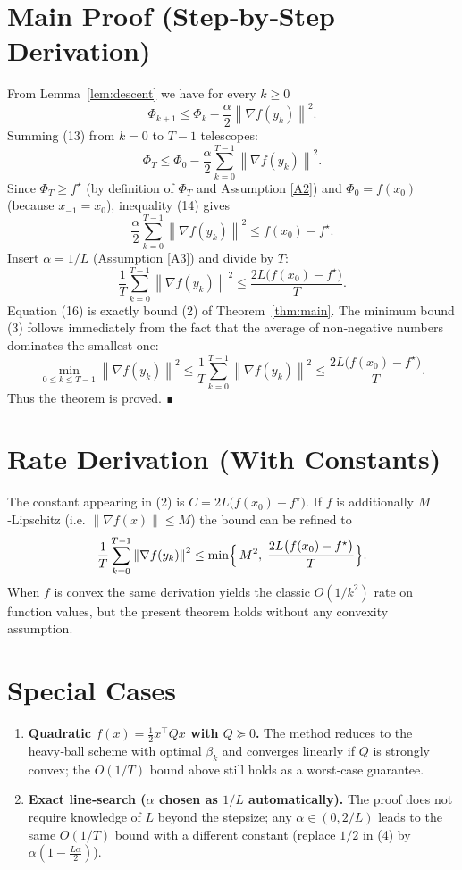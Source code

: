 \documentclass{article}
\newcommand{\grad}{\nabla}
\newcommand{\norm}[1]{\left\|#1\right\|}
\begin{document}
\section*{Main Proof (Step‑by‑Step Derivation)}
From Lemma~\ref{lem:descent} we have for every $k\ge0$
\[
\Phi_{k+1}\le\Phi_k-\frac{\alpha}{2}\norm{\grad f(y_k)}^{2}.
\tag{13}
\]
Summing (13) from $k=0$ to $T-1$ telescopes:
\[
\Phi_T\le\Phi_0-\frac{\alpha}{2}\sum_{k=0}^{T-1}\norm{\grad f(y_k)}^{2}.
\tag{14}
\]
Since $\Phi_T\ge f^\star$ (by definition of $\Phi_T$ and Assumption \ref{A2}) and $\Phi_0=f(x_0)$ (because $x_{-1}=x_0$), inequality (14) gives
\[
\frac{\alpha}{2}\sum_{k=0}^{T-1}\norm{\grad f(y_k)}^{2}
\le f(x_0)-f^\star .
\tag{15}
\]
Insert $\alpha=1/L$ (Assumption \ref{A3}) and divide by $T$:
\[
\frac{1}{T}\sum_{k=0}^{T-1}\norm{\grad f(y_k)}^{2}
\le \frac{2L\bigl(f(x_0)-f^\star\bigr)}{T}.
\tag{16}
\]
Equation (16) is exactly bound (2) of Theorem~\ref{thm:main}.  The minimum bound (3) follows immediately from the fact that the average of non‑negative numbers dominates the smallest one:
\[
\min_{0\le k\le T-1}\norm{\grad f(y_k)}^{2}
\le\frac{1}{T}\sum_{k=0}^{T-1}\norm{\grad f(y_k)}^{2}
\le\frac{2L\bigl(f(x_0)-f^\star\bigr)}{T}.
\tag{17}
\]
Thus the theorem is proved. ∎

\section*{Rate Derivation (With Constants)}
The constant appearing in (2) is $C=2L\bigl(f(x_0)-f^\star\bigr)$.  
If $f$ is additionally $M$‑Lipschitz (i.e. $\norm{\grad f(x)}\le M$) the bound can be refined to
\[
\frac{1}{T}\sum_{k=0}^{T-1}\norm{\grad f(y_k)}^{2}
\le \min\Bigl\{\,M^{2},\;\frac{2L\bigl(f(x_0)-f^\star\bigr)}{T}\Bigr\}.
\]
When $f$ is convex the same derivation yields the classic $O(1/k^{2})$ rate on function values, but the present theorem holds without any convexity assumption.

\section*{Special Cases}
\begin{enumerate}[label={\bf S\arabic*}.]
\item \textbf{Quadratic $f(x)=\frac{1}{2}x^{\!\top}Qx$ with $Q\succeq0$.}  
   The method reduces to the heavy‑ball scheme with optimal $\beta_k$ and converges linearly if $Q$ is strongly convex; the $O(1/T)$ bound above still holds as a worst‑case guarantee.
\item \textbf{Exact line‑search ($\alpha$ chosen as $1/L$ automatically).}  
   The proof does not require knowledge of $L$ beyond the stepsize; any $\alpha\in(0,2/L)$ leads to the same $O(1/T)$ bound with a different constant (replace $1/2$ in (4) by $\alpha(1-\frac{L\alpha}{2})$).
\end{enumerate}
\end{document}

